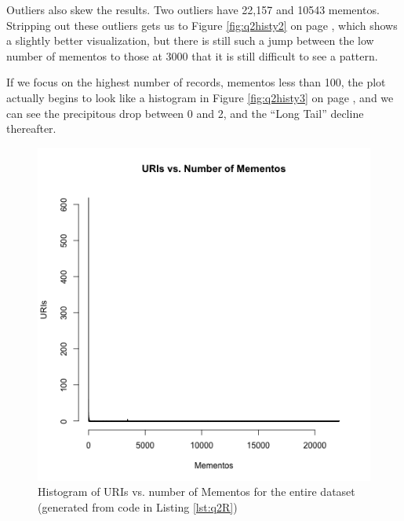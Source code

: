 \documentclass[letterpaper,11pt]{article}
\begin{document}
Outliers also skew the results.  Two outliers have 22,157 and 10543 mementos.  Stripping out these outliers gets us to Figure \ref{fig:q2histy2} on page \pageref{fig:q2histy2}, which shows a slightly better visualization, but there is still such a jump between the low number of mementos to those at 3000 that it is still difficult to see a pattern.

If we focus on the highest number of records, mementos less than 100, the plot actually begins to look like a histogram in Figure \ref{fig:q2histy3} on page \pageref{fig:q2histy3}, and we can see the precipitous drop between 0 and 2, and the ``Long Tail'' decline thereafter.

\begin{figure}
\includegraphics[scale=0.7]{work/q2/q2-histogram1.png}
\caption{Histogram of URIs vs. number of Mementos for the entire dataset (generated from code in Listing \ref{lst:q2R})}
\label{fig:q2histy1}
\end{figure}
\end{document}

